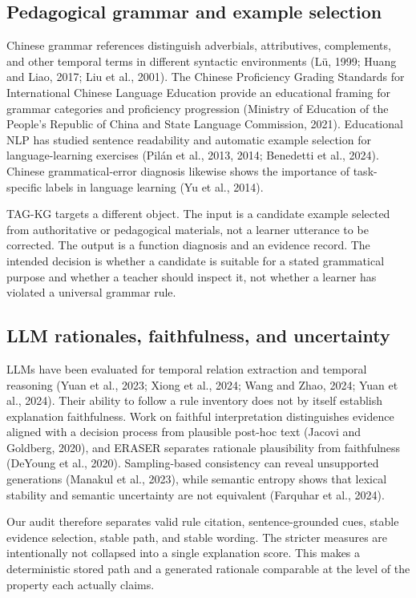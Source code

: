 \documentclass{CUP-JNL-NLP}
\begin{document}
\subsection{Pedagogical grammar and example selection}
Chinese grammar references distinguish adverbials, attributives, complements, and other temporal terms in different syntactic environments (Lü, 1999; Huang and Liao, 2017; Liu et al., 2001). The Chinese Proficiency Grading Standards for International Chinese Language Education provide an educational framing for grammar categories and proficiency progression (Ministry of Education of the People's Republic of China and State Language Commission, 2021). Educational NLP has studied sentence readability and automatic example selection for language-learning exercises (Pilán et al., 2013, 2014; Benedetti et al., 2024). Chinese grammatical-error diagnosis likewise shows the importance of task-specific labels in language learning (Yu et al., 2014).

TAG-KG targets a different object. The input is a candidate example selected from authoritative or pedagogical materials, not a learner utterance to be corrected. The output is a function diagnosis and an evidence record. The intended decision is whether a candidate is suitable for a stated grammatical purpose and whether a teacher should inspect it, not whether a learner has violated a universal grammar rule.

\subsection{LLM rationales, faithfulness, and uncertainty}
LLMs have been evaluated for temporal relation extraction and temporal reasoning (Yuan et al., 2023; Xiong et al., 2024; Wang and Zhao, 2024; Yuan et al., 2024). Their ability to follow a rule inventory does not by itself establish explanation faithfulness. Work on faithful interpretation distinguishes evidence aligned with a decision process from plausible post-hoc text (Jacovi and Goldberg, 2020), and ERASER separates rationale plausibility from faithfulness (DeYoung et al., 2020). Sampling-based consistency can reveal unsupported generations (Manakul et al., 2023), while semantic entropy shows that lexical stability and semantic uncertainty are not equivalent (Farquhar et al., 2024).

Our audit therefore separates valid rule citation, sentence-grounded cues, stable evidence selection, stable path, and stable wording. The stricter measures are intentionally not collapsed into a single explanation score. This makes a deterministic stored path and a generated rationale comparable at the level of the property each actually claims.
\end{document}
